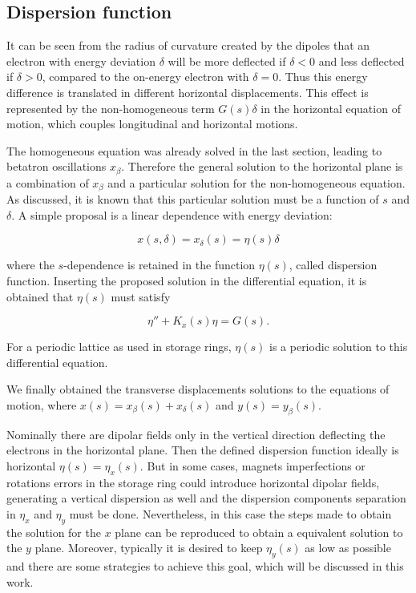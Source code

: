 \subsection{Dispersion function}

It can be seen from the radius of curvature created by the dipoles that an electron with energy deviation $\delta$ will be more deflected if $\delta < 0$ and less deflected if $\delta > 0$, compared to the on-energy electron with $\delta = 0$. Thus this energy difference is translated in different horizontal displacements. This effect is represented by the non-homogeneous term $G(s)\delta$ in the horizontal equation of motion, which couples longitudinal and horizontal motions.

The homogeneous equation was already solved in the last section, leading to betatron oscillations $x_{\beta}$. Therefore the general solution to the horizontal plane is a combination of $x_{\beta}$ and a particular solution for the non-homogeneous equation. As discussed, it is known that this particular solution must be a function of $s$ and $\delta$. A simple proposal is a linear dependence with energy deviation: 

\begin{equation}
    x(s, \delta) = x_{\delta}(s) = \eta(s) \delta
\end{equation}

where the $s$-dependence is retained in the function $\eta(s)$, called dispersion function. Inserting the proposed solution in the differential equation, it is obtained that $\eta(s)$ must satisfy

\begin{equation}
    \eta'' + K_x(s)\eta = G(s).
    \label{eq:dispersion}
\end{equation}

For a periodic lattice as used in storage rings, $\eta(s)$ is a periodic solution to this differential equation.

We finally obtained the transverse displacements solutions to the equations of motion, where $x(s) = x_{\beta}(s) + x_{\delta} (s)$ and $y(s) = y_{\beta}(s)$. 

Nominally there are dipolar fields only in the vertical direction deflecting the electrons in the horizontal plane. Then the defined dispersion function ideally is horizontal $\eta(s) = \eta_x(s)$. But in some cases, magnets imperfections or rotations errors in the storage ring could introduce horizontal dipolar fields, generating a vertical dispersion as well and the dispersion components separation in $\eta_x$ and $\eta_y$ must be done. Nevertheless, in this case the steps made to obtain the solution for the $x$ plane can be reproduced to obtain a equivalent solution to the $y$ plane. Moreover, typically it is desired to keep $\eta_y(s)$ as low as possible and there are some strategies to achieve this goal, which will be discussed in this work.

